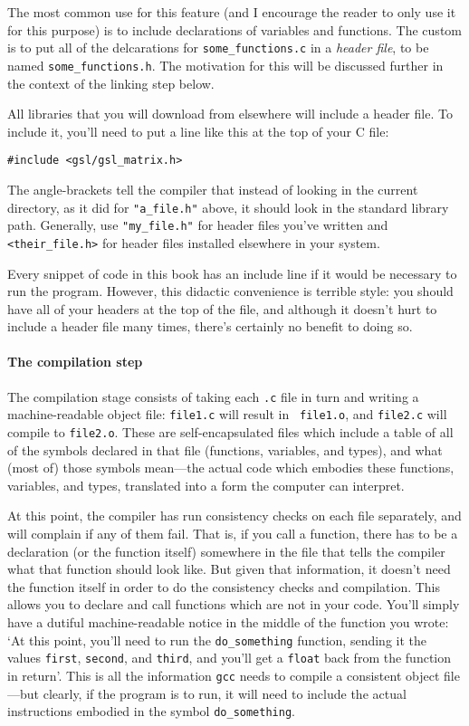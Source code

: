\documentclass[12pt]{article}
\def\ind#1{\index{#1}#1}
\begin{document}
The most common use for this feature (and I encourage the reader to
only use it for this purpose) is to include declarations of variables
and functions. The custom is to put all of the delcarations for {\tt some\_functions.c} in a {\sl \ind{header file}}, to be named {\tt some\_functions.h}.
The motivation for this will be discussed further in the context of the
linking step below.  

All libraries that you will download from elsewhere will include a header file.
To include it, you'll need to put a line like this at the top of your C file:
\begin{verbatim}
#include <gsl/gsl_matrix.h>
\end{verbatim}
The angle-brackets tell the compiler that instead of looking in the
current directory, as it did for {\tt "a\_file.h"} above, it should
look in the standard library path. Generally, use {\tt "my\_file.h"} for
header files you've written and {\tt <their\_file.h>} for header files installed elsewhere
in your system.

Every snippet of code in this book has an include line if it would be
necessary to run the program.  However, this didactic convenience is
terrible style: you should have all of your headers at the top of the
file, and although it doesn't hurt to include a header file many times,
there's certainly no benefit to doing so.


\paragraph{The compilation step} 
The \ind{compilation}
stage consists of taking each {\tt .c} file in turn and writing
a machine-readable object file: {\tt file1.c} will result in {\tt
file1.o}, and {\tt file2.c} will compile to {\tt file2.o}. These  are
self-encapsulated files which include a table of all of the symbols
declared in that file (functions, variables, and types), and what (most of) those
symbols mean---the actual code which embodies these functions, variables,
and types, translated into a form the computer can interpret.

At this point, the compiler has run consistency checks on each file separately,
and will complain if any of them fail. That is, if you call a function,
there has to be a declaration (or the function itself) somewhere in the
file that tells the compiler what that function should look like. But 
given that information, it doesn't need the function itself in order to
do the consistency checks and compilation. This allows you to declare
and call functions which are not in your code. You'll simply have a
dutiful machine-readable notice in the middle of the function you wrote:
`At this point, you'll need to run the {\tt do\_something} function,
sending it the values {\tt first}, {\tt second}, and {\tt third}, and
you'll get a {\tt float} back from the function in return'. This is
all the information {\tt gcc} needs to compile a consistent object file---but
clearly, if the program is to run, it will need to include the actual
instructions embodied in the symbol {\tt do\_something}.
\end{document}
